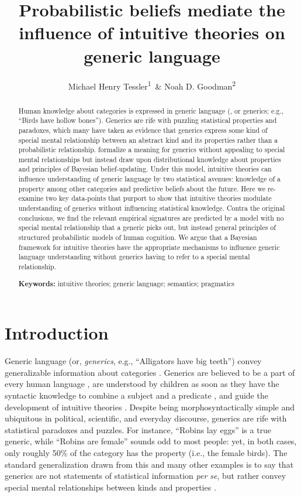 \documentclass[floatsintext,doc]{apa6}
\title{Probabilistic beliefs mediate the influence of intuitive theories on generic language}
\author{Michael Henry Tessler\textsuperscript{1}~\& Noah D. Goodman\textsuperscript{2}}
\affiliation{
\vspace{0.5cm}
 \textsuperscript{1} Massachusetts Institute of Technology, Department of Brain and Cognitive Sciences\\\textsuperscript{2} Stanford University, Departments of Psychology and Computer Science 
}
\begin{document}
\maketitle

\begin{abstract}

Human knowledge about categories is expressed in generic language (, or generics; e.g., ``Birds have hollow bones''). 
Generics are rife with puzzling statistical properties and paradoxes, which many have taken as evidence that generics express some kind of special mental relationship between an abstract kind and its properties rather than a probabilistic relationship. 
 formalize a meaning for generics without appealing to special mental relationships but instead draw upon distributional knowledge about properties and principles of Bayesian belief-updating.
Under this model, intuitive theories can influence understanding of generic language by two statistical avenues: knowledge of a property among other categories and predictive beliefs about the future. 
Here we re-examine two key data-points that purport to show that intuitive theories modulate understanding of generics without influencing statistical knowledge. 
Contra the original conclusions, we find the relevant empirical signatures are predicted by a model with no special mental relationship that a generic picks out, but instead general principles of structured probabilistic models of human cognition. 
We argue that a Bayesian framework for intuitive theories have the appropriate mechanisms to influence generic language understanding without generics having to refer to a special mental relationship.

\textbf{Keywords:} 
intuitive theories; generic language; semantics; pragmatics
\end{abstract}

\section{Introduction}
\label{sec:intro}


Generic language (or, \emph{generics}, e.g., ``Alligators have big teeth'') convey generalizable information about categories \cite{Carlson1977, Carlson1995}.
Generics are believed to be a part of every human language \cite{Behrens2005}, are understood by children as soon as they have the syntactic knowledge to combine a subject and a predicate \cite{graham2011two}, and guide the development of intuitive theories \cite{Gelman2003}.
Despite being morphosyntactically simple and ubiquitous in political, scientific, and everyday discourse, generics are rife with statistical paradoxes and puzzles.
For instance, ``Robins lay eggs'' is a true generic, while ``Robins are female'' sounds odd to most people: yet, in both cases, only roughly 50\% of the category has the property (i.e., the female birds). 
The standard generalization drawn from this and many other examples is to say that generics are not statements of statistical information \emph{per se}, but rather convey special mental relationships between kinds and properties \cite{Gelman2007, Leslie2008, Prasada2000, Cimpian2010theory, Cimpian2010}.
\end{document}
